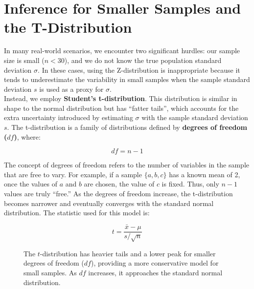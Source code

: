 \documentclass[12pt]{scrartcl}
\begin{document}
\section{Inference for Smaller Samples and the T-Distribution}
In many real-world scenarios, we encounter two significant hurdles: our sample size is small ($n < 30$), and we do not know the true population standard deviation $\sigma$. In these cases, using the Z-distribution is inappropriate because it tends to underestimate the variability in small samples when the sample standard deviation $s$ is used as a proxy for $\sigma$. \\

Instead, we employ \textbf{Student's t-distribution}. This distribution is similar in shape to the normal distribution but has ``fatter tails'', which accounts for the extra uncertainty introduced by estimating $\sigma$ with the sample standard deviation $s$. The t-distribution is a family of distributions defined by \textbf{degrees of freedom ($df$)}, where:

\[ df = n - 1 \]

The concept of degrees of freedom refers to the number of variables in the sample that are free to vary. For example, if a sample $\{a, b, c\}$ has a known mean of 2, once the values of $a$ and $b$ are chosen, the value of $c$ is fixed. Thus, only $n-1$ values are truly ``free.'' As the degrees of freedom increase, the t-distribution becomes narrower and eventually converges with the standard normal distribution. The statistic used for this model is:

\[ t = \frac{\bar{x} - \mu}{s / \sqrt{n}} \]

\begin{figure}[H]
    \centering
    \caption{The $t$-distribution has heavier tails and a lower peak for smaller degrees of freedom ($df$), providing a more conservative model for small samples. As $df$ increases, it approaches the standard normal distribution.}
\end{figure}
\end{document}
